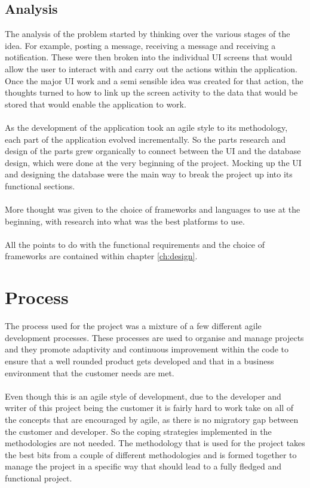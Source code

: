 \subsection{Analysis}

The analysis of the problem started by thinking over the various stages of the idea. For example, posting a message, receiving a message and receiving a notification. These were then broken into the individual UI screens that would allow the user to interact with and carry out the actions within the application. Once the major UI work and a semi sensible idea was created for that action, the thoughts turned to how to link up the screen activity to the data that would be stored that would enable the application to work.\\
\\
As the development of the application took an agile style to its methodology, each part of the application evolved incrementally. So the parts research and design of the parts grew organically to connect between the UI and the database design, which were done at the very beginning of the project. Mocking up the UI and designing the database were the main way to break the project up into its functional sections.\\
\\
More thought was given to the choice of frameworks and languages to use at the beginning, with research into what was the best platforms to use.\\
\\
All the points to do with the functional requirements and the choice of frameworks are contained within chapter \ref{ch:design}.

\section{Process}

The process used for the project was a mixture of a few different agile development processes. These processes are used to organise and manage projects and they promote adaptivity and continuous improvement within the code to ensure that a well rounded product gets developed and that in a business environment that the customer needs are met.\\
\\
Even though this is an agile style of development, due to the developer and writer of this project being the customer it is fairly hard to work take on all of the concepts that are encouraged by agile, as there is no migratory gap between the customer and developer. So the coping strategies implemented in the methodologies are not needed. The methodology that is used for the project takes the best bits from a couple of different methodologies and is formed together to manage the project in a specific way that should lead to a fully fledged and functional project.


